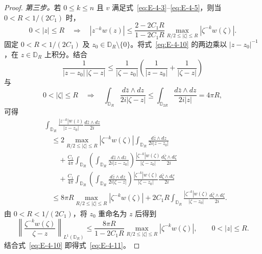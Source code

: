 \begin{proof}
\emph{第三步。}若 $0\le k\le n$ 且 $v$ 满足式~\eqref{eq:E-4-3}--\eqref{eq:E-4-5}，则当 $0<R<1/(2C_1)$ 时，
\begin{equation}\label{eq:E-4-11}
  0<|z|\le R\quad\Longrightarrow\quad
  |z^{-k}w(z)|
  \le\frac{2-2C_1R}{1-2C_1R}
       \max_{R/2\le|\zeta|\le R}|\zeta^{-k}w(\zeta)|.
\end{equation}
固定 $0<R<1/(2C_1)$ 及 $z_0\in\mathbb D_R\setminus\{0\}$。将式~\eqref{eq:E-4-10} 的两边乘以 $|z-z_0|^{-1}$，在 $z\in\mathbb D_R$ 上积分。结合
\[
  \frac1{|z-z_0|\,|\zeta-z|}
  \le\frac1{|\zeta-z_0|}
      \left(\frac1{|z-z_0|}+\frac1{|\zeta-z|}\right)
\]
与
\[
  0<|\zeta|\le R\quad\Longrightarrow\quad
  \int_{\mathbb D_R}\frac{d\bar z\wedge dz}{2i|\zeta-z|}
  \le\int_{\mathbb D_{2R}}\frac{d\bar z\wedge dz}{2i|z|}
  =4\pi R,
\]
可得
\begin{align*}
&\int_{\mathbb D_R}\frac{|z^{-k}|w(z)}{|z-z_0|}
     \frac{d\bar z\wedge dz}{2i}\\
&\quad\le 2\max_{R/2\le|\zeta|\le R}|\zeta^{-k}w(\zeta)|
    \int_{\mathbb D_R}\frac{d\bar z\wedge dz}{2i|z-z_0|}\\
&\qquad+\frac{C_1}{4\pi}\int_{\mathbb D_R}
   \left(\int_{\mathbb D_R}\frac{d\bar z\wedge dz}{2i|z-z_0|}\right)
   \frac{|\zeta^{-k}|w(\zeta)}{|\zeta-z_0|}
   \frac{d\bar\zeta\wedge d\zeta}{2i}\\
&\qquad+\frac{C_1}{4\pi}\int_{\mathbb D_R}
   \left(\int_{\mathbb D_R}\frac{d\bar z\wedge dz}{2i|\zeta-z|}\right)
   \frac{|\zeta^{-k}|w(\zeta)}{|\zeta-z_0|}
   \frac{d\bar\zeta\wedge d\zeta}{2i}\\
&\quad\le 8\pi R\max_{R/2\le|\zeta|\le R}|\zeta^{-k}w(\zeta)|
  +2C_1R\int_{\mathbb D_R}
     \frac{|\zeta^{-k}|w(\zeta)}{|\zeta-z_0|}
     \frac{d\bar\zeta\wedge d\zeta}{2i}.
\end{align*}
由 $0<R<1/(2C_1)$，将 $z_0$ 重命名为 $z$ 后得到
\[
  \left\|\frac{\zeta^{-k}w(\zeta)}{\zeta-z}\right\|_{L^1(\mathbb D_R)}
  \le\frac{8\pi R}{1-2C_1R}
      \max_{R/2\le|\zeta|\le R}|\zeta^{-k}w(\zeta)|,
  \qquad 0<|z|\le R.
\]
结合式~\eqref{eq:E-4-10} 即得式~\eqref{eq:E-4-11}。


\end{proof}
